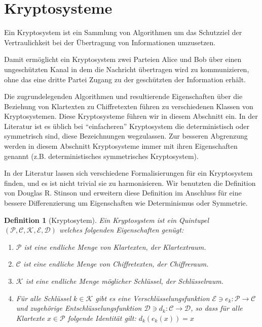 \section{Kryptosysteme}
Ein Kryptosystem ist ein Sammlung von Algorithmen um das Schutzziel der Vertraulichkeit bei der Übertragung von Informationen umzusetzen.

Damit ermöglicht ein Kryptosystem zwei Parteien Alice und Bob über einen ungeschützten Kanal in dem die Nachricht übertragen wird zu kommunizieren, ohne das eine dritte Partei Zugang zu der geschützten der Information erhält.

Die zugrundelegenden Algorithmen und resultierende Eigenschaften über die Beziehung von Klartexten zu Chiffretexten führen zu verschiedenen Klassen von Kryptosystemen. Diese Kryptosysteme führen wir in diesem Abschnitt ein. In der Literatur ist es üblich bei \enquote{einfacheren} Kryptosystem die deterministisch oder symmetrisch sind, diese Bezeichnungen wegzulassen. Zur besseren Abgrenzung werden in diesem Abschnitt Kryptosysteme immer mit ihren Eigenschaften genannt (z.B. deterministisches symmetrisches Kryptosystem).

In der Literatur lassen sich verschiedene Formalisierungen für ein Kryptosystem finden, und es ist nicht trivial sie zu harmonisieren. Wir benutzten die Definition von Douglas R. Stinson \cite[p.1]{stinson2006cryptography} und erweitern diese Definition im Anschluss für eine bessere Differenzierung um Eigenschaften wie Determinismus oder Symmetrie.

\newtheorem{theorem}{Definition}[section]
\begin{theorem}[Kryptosytem]
	\label{KS}
	Ein Kryptosystem ist ein Quintupel $(\mathcal{P},\mathcal{C},\mathcal{K},\mathcal{E},\mathcal{D})$ welches folgenden Eigenschaften genügt:
	\begin{enumerate}
		\item $\mathcal{P}$ ist eine endliche Menge von Klartexten, der Klartextraum.
		\item $\mathcal{C}$ ist eine endliche Menge von Chiffretexten, der Chiffreraum.
		\item $\mathcal{K}$ ist eine endliche Menge möglicher Schlüssel, der Schlüsselraum.
		\item Für alle Schlüssel $k\in \mathcal{K}$ gibt es eine Verschlüsselungsfunktion $\mathcal{E}\ni e_k:\mathcal{P}\rightarrow\mathcal{C}$ und zugehörige Entschlüsselungsfunktion $\mathcal{D}\ni d_k:\mathcal{C}\rightarrow\mathcal{D}$, so dass für alle Klartexte $x\in\mathcal{P}$ folgende Identität gilt: $d_k(e_k(x)) = x$
	\end{enumerate}
\end{theorem}

